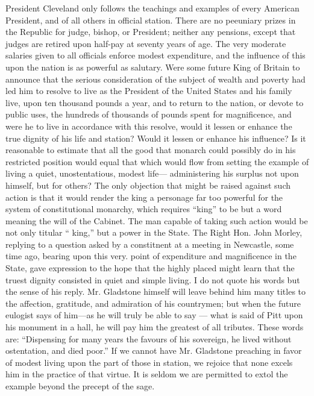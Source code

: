 \documentclass[11pt,openany]{book}
\begin{document}
President Cleveland only follows the teachings and examples of every American President, and of all others in official station. There are no peeuniary prizes in the Republic for judge, bishop, or President; neither any pensions, except that judges are retired upon half-pay at seventy years of age. The very moderate salaries given to all officials enforce modest expenditure, and the influence of this upon the nation is as powerful as salutary. Were some future King of Britain to announce that the serious consideration of the subject of wealth and poverty had led him to resolve to live as the President of the United States and his family live, upon ten thousand pounds a year, and to return to the nation, or devote to public uses, the hundreds of thousands of pounds spent for magnificence, and were he to live in accordance with this resolve, would it lessen or enhance the true dignity of his life and station? Would it lessen or enhance his influence? Is it reasonable to estimate that all the good that monarch could possibly do in his restricted position would equal that which would flow from setting the example of living a quiet, unostentatious, modest life--- administering his surplus not upon himself, but for others? The only objection that might be raised against such action is that it would render the king a personage far too powerful for the system of constitutional monarchy, which requires ``king'' to be but a word meaning the will of the Cabinet. The man capable of taking such action would be not only titular `` king,'' but a power in the State. The Right Hon. John Morley, replying to a question asked by a constitnent at a meeting in Newcastle, some time ago, bearing upon this very. point of expenditure and magnificence in the State, gave expression to the hope that the highly placed might learn that the truest dignity consisted in quiet and simple living. I do not quote his words but the sense of his reply. Mr. Gladstone himself will leave behind him many titles to the affection, gratitude, and admiration of his countrymen; but when the future eulogist says of him---as he will truly be able to say --- what is said of Pitt upon his monument in a hall, he will pay him the greatest of all tributes. These words are: ``Dispensing for many years the favours of his sovereign, he lived without ostentation, and died poor.'' If we cannot have Mr. Gladstone preaching in favor of modest living upon the part of those in station, we rejoice that none excels him in the practice of that virtue. It is seldom we are permitted to extol the example beyond the precept of the sage.
\end{document}
